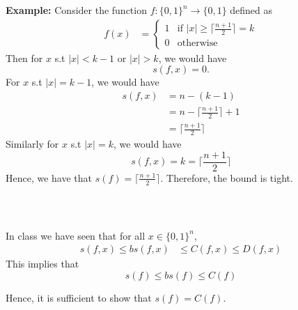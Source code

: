 \documentclass{article}
\begin{document}
\noindent
\textbf{Example:} Consider the function $f : \{0, 1\}^n \rightarrow \{0, 1\}$ defined as
\begin{align}
	f(x) &= \begin{cases}
		1 & \text{if } |x| \geq \Big\lceil \frac{n+1}{2} \Big\rceil = k \\
		0 & \text{otherwise}
	\end{cases}
\end{align}
Then for $x$ s.t $|x| < k - 1$ or $|x| > k$, we would have 
$$s(f, x) = 0.$$ 
For $x$ s.t $|x| = k - 1$, we would have 
\begin{align*}
	s(f, x) &= n - (k - 1) \\
	&= n - \Big\lceil \frac{n+1}{2} \Big\rceil + 1 \\
	&= \Big\lceil \frac{n+1}{2} \Big\rceil
\end{align*}
Similarly for $x$ s.t $|x| = k$, we would have
$$ s(f, x) = k = \Big\lceil \frac{n+1}{2} \Big\rceil $$
Hence, we have that $s(f) = \Big\lceil \frac{n+1}{2} \Big\rceil$. Therefore, the bound is tight.
\vspace*{-2mm}\begin{flushright}\qedsymbol{}\end{flushright}

\,
\subsection{}

In class we have seen that for all $x \in \{0, 1\}^n$,
\begin{align}
	s(f, x) \leq bs(f, x) &\leq C(f, x) \leq D(f, x)
\end{align}
This implies that
$$ s(f) \leq bs(f) \leq C(f) $$

\noindent
Hence, it is sufficient to show that $s(f) = C(f)$.


\,
\subsection{}


\,
\end{document}

